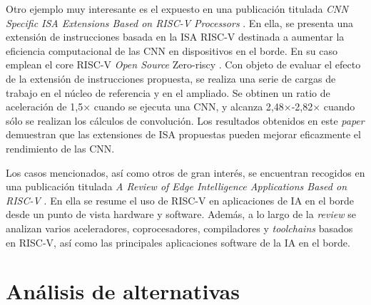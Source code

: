 Otro ejemplo muy interesante es el expuesto en una publicación titulada \textit{CNN Specific ISA Extensions Based on RISC-V Processors} \cite{9802445}.
En ella, se presenta una extensión de instrucciones basada en la ISA RISC-V destinada a aumentar la eficiencia computacional de las CNN en dispositivos en el borde. 
En su caso emplean el core RISC-V \textit{Open Source} Zero-riscy \cite{8106976} \cite{gh:zero-riscy}.
Con objeto de evaluar el efecto de la extensión de instrucciones propuesta, se realiza una serie de cargas de trabajo en el núcleo de referencia y en el ampliado. 
Se obtinen un ratio de aceleración de 1,5× cuando se ejecuta una CNN, y alcanza 2,48×-2,82× cuando sólo se realizan los cálculos de convolución. 
Los resultados obtenidos en este  \textit{paper} demuestran que las extensiones de ISA propuestas pueden mejorar eficazmente el rendimiento de las CNN.

Los casos mencionados, así como otros de gran interés, se encuentran recogidos en una publicación titulada \textit{A Review of Edge Intelligence Applications Based on RISC-V} \cite{10336594}.
En ella se resume el uso de RISC-V en aplicaciones de IA en el borde desde un punto de vista hardware y software. 
Además, a lo largo de la \textit{review} se analizan varios aceleradores, coprocesadores, compiladores y \textit{toolchains} basados en RISC-V, así como las principales aplicaciones software de la IA en el borde. 

\section{Análisis de alternativas}

